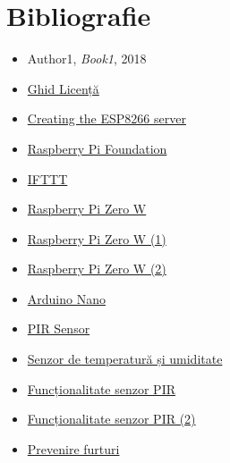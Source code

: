 \chapter*{Bibliografie} 

\begin{itemize}
    \item Author1, \textit{Book1}, 2018
    \item \href{https://profs.info.uaic.ro/~licenta/2019Feb/res/Ghid-LICENTA-2018.pdf}{Ghid Licență}
	\item \href{https://tttapa.github.io/ESP8266/Chap10%20-%20Simple%20Web%20Server.html}{Creating the ESP8266 server}
	\item \href{https://www.raspberrypi.org/}{Raspberry Pi Foundation}
	\item \href{https://www.pcmag.com/reviews/ifttt}{IFTTT}
	\item \href{https://www.pcmag.com/reviews/raspberry-pi-zero-w}{Raspberry Pi Zero W}
	\item \href{https://www.trustedreviews.com/reviews/1-raspberry-pi-zero-w}{Raspberry Pi Zero W (1)}
	\item \href{https://itsfoss.com/raspberry-pi-zero-w/}{Raspberry Pi Zero W (2)}
	\item \href{https://www.makeuseof.com/tag/cheapest-arduino-nano/}{Arduino Nano}
	\item \href{https://www.elektor.com/hc-sr501-pir-motion-sensor-module}{PIR Sensor}
	\item \href{https://www.optimusdigital.ro/ro/senzori-senzori-de-temperatura/1449-modul-senzor-de-temperatura-i-umiditate-dht22.html?search_query=temperatura&results=1060}{Senzor de temperatură și umiditate}
	\item \href{https://lumoscontrols.com/resources/microwave-vs-pir-motion-sensors/}{Funcționalitate senzor PIR}
	\item \href{https://www.tutorialspoint.com/arduino/arduino_pir_sensor.htm}{Funcționalitate senzor PIR (2)}
	\item \href{https://www.politiaromana.ro/ro/prevenire/furturi-din-locuinte}{Prevenire furturi}
	
\end{itemize}